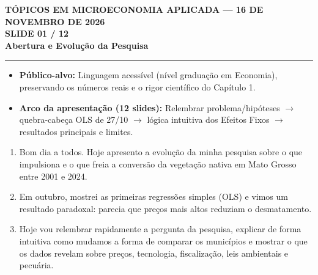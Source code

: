 \documentclass[11pt,a4paper]{article}
\newcommand{\slidenum}{1}
\begin{document}
\renewcommand{\slidenum}{1}
\noindent
\begin{minipage}{\textwidth}
\begin{center}
{\color{cinza}\footnotesize\textbf{TÓPICOS EM MICROECONOMIA APLICADA --- 16 DE NOVEMBRO DE 2026}\\[1.2mm]}
{\color{cinza}\bfseries\Large SLIDE 01 / 12\\[1.5mm]}
{\color{verde}\bfseries\LARGE Abertura e Evolução da Pesquisa\\[2.5mm]}
\rule{\textwidth}{1pt}
\end{center}
\end{minipage}
\vspace{1.5mm}

\begin{tcolorbox}[title={\bfseries\small ÂNCORAS DO SLIDE}]
\begin{itemize}[leftmargin=*,itemsep=1mm,topsep=0.5mm]
    \item \textbf{Público-alvo:} Linguagem acessível (nível graduação em Economia), preservando os números reais e o rigor científico do Capítulo 1.
    \item \textbf{Arco da apresentação (12 slides):} Relembrar problema/hipóteses $\rightarrow$ quebra-cabeça OLS de 27/10 $\rightarrow$ lógica intuitiva dos Efeitos Fixos $\rightarrow$ resultados principais e limites.
\end{itemize}
\end{tcolorbox}
\vspace{2mm}

\vspace{1mm}
\begin{enumerate}[leftmargin=*,label=\textbf{(\arabic*)},itemsep=2.6mm,topsep=1mm]
    \item Bom dia a todos. Hoje apresento a evolução da minha pesquisa sobre o que impulsiona e o que freia a conversão da vegetação nativa em Mato Grosso entre 2001 e 2024.
    \item Em outubro, mostrei as primeiras regressões simples (OLS) e vimos um resultado paradoxal: parecia que preços mais altos reduziam o desmatamento.
    \item Hoje vou relembrar rapidamente a pergunta da pesquisa, explicar de forma intuitiva como mudamos a forma de comparar os municípios e mostrar o que os dados revelam sobre preços, tecnologia, fiscalização, leis ambientais e pecuária.
\end{enumerate}
\end{document}
